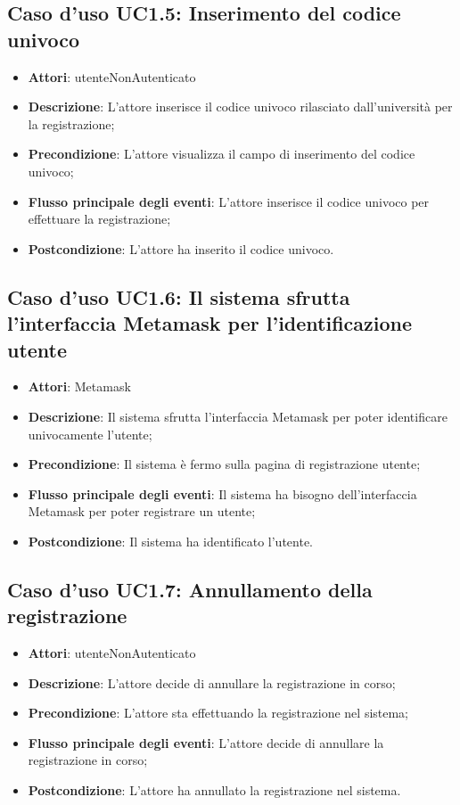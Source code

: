 \subsection{Caso d'uso \texorpdfstring{UC1.5}{UC1.5}: Inserimento del codice univoco}
\begin{itemize}
\item \textbf{Attori}: utenteNonAutenticato
\item \textbf{Descrizione}: L'attore inserisce il codice univoco rilasciato dall'università per la registrazione;
\item \textbf{Precondizione}: L'attore visualizza il campo di inserimento del codice univoco;
\item \textbf{Flusso principale degli eventi}: L'attore inserisce il codice univoco per effettuare la registrazione;
\item \textbf{Postcondizione}: L'attore ha inserito il codice univoco.
\end{itemize}
\subsection{Caso d'uso \texorpdfstring{UC1.6}{UC1.6}: Il sistema sfrutta l'interfaccia Metamask per l'identificazione utente}
\begin{itemize}
\item \textbf{Attori}: Metamask
\item \textbf{Descrizione}: Il sistema sfrutta l'interfaccia Metamask per poter identificare univocamente l'utente;
\item \textbf{Precondizione}: Il sistema è fermo sulla pagina di registrazione utente;
\item \textbf{Flusso principale degli eventi}: Il sistema ha bisogno dell'interfaccia Metamask per poter registrare un utente;
\item \textbf{Postcondizione}: Il sistema ha identificato l'utente.
\end{itemize}
\subsection{Caso d'uso \texorpdfstring{UC1.7}{UC1.7}: Annullamento della registrazione}
\begin{itemize}
\item \textbf{Attori}: utenteNonAutenticato
\item \textbf{Descrizione}: L'attore decide di annullare la registrazione in corso;
\item \textbf{Precondizione}: L'attore sta effettuando la registrazione nel sistema;
\item \textbf{Flusso principale degli eventi}: L'attore decide di annullare la registrazione in corso;
\item \textbf{Postcondizione}: L'attore ha annullato la registrazione nel sistema.
\end{itemize}
